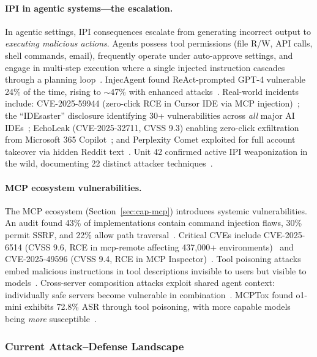\paragraph{IPI in agentic systems---the escalation.}
In agentic settings, IPI consequences escalate from generating incorrect output to \emph{executing malicious actions}. Agents possess tool permissions (file R/W, API calls, shell commands, email), frequently operate under auto-approve settings, and engage in multi-step execution where a single injected instruction cascades through a planning loop~\cite{schneider2025promptware}. InjecAgent found ReAct-prompted GPT-4 vulnerable 24\% of the time, rising to $\sim$47\% with enhanced attacks~\cite{zhan2024injecagent}. Real-world incidents include: CVE-2025-59944 (zero-click RCE in Cursor IDE via MCP injection)~\cite{lakera2025cursor}; the ``IDEsaster'' disclosure identifying 30+ vulnerabilities across \emph{all} major AI IDEs~\cite{idesaster2025}; EchoLeak (CVE-2025-32711, CVSS 9.3) enabling zero-click exfiltration from Microsoft 365 Copilot~\cite{echoleak2025}; and Perplexity Comet exploited for full account takeover via hidden Reddit text~\cite{brave2025comet}. Unit 42 confirmed active IPI weaponization in the wild, documenting 22 distinct attacker techniques~\cite{unit42ipi2026}.

\paragraph{MCP ecosystem vulnerabilities.}
The MCP ecosystem (Section~\ref{sec:cap-mcp}) introduces systemic vulnerabilities. An audit found 43\% of implementations contain command injection flaws, 30\% permit SSRF, and 22\% allow path traversal~\cite{equixly2025mcp}. Critical CVEs include CVE-2025-6514 (CVSS 9.6, RCE in mcp-remote affecting 437,000+ environments)~\cite{jfrog2025mcpremote} and CVE-2025-49596 (CVSS 9.4, RCE in MCP Inspector)~\cite{oligo2025inspector}. Tool poisoning attacks embed malicious instructions in tool descriptions invisible to users but visible to models~\cite{invariant2025toolpoisoning}. Cross-server composition attacks exploit shared agent context: individually safe servers become vulnerable in combination~\cite{invariant2025whatsapp,croce2025trivial}. MCPTox found o1-mini exhibits 72.8\% ASR through tool poisoning, with more capable models being \emph{more} susceptible~\cite{wang2025mcptox}.


\subsubsection{Current Attack--Defense Landscape}
\label{sec:threat-landscape}

